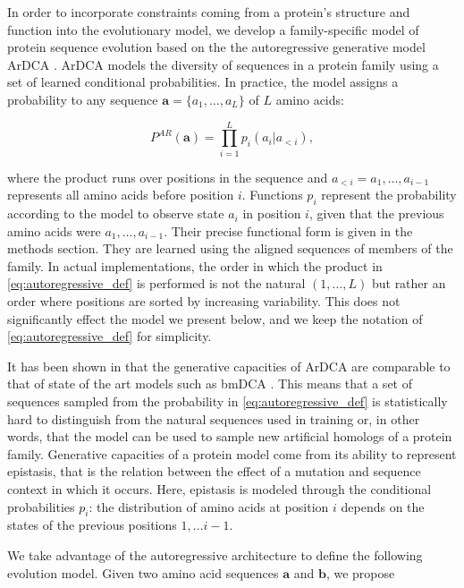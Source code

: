 In order to incorporate constraints coming from a protein's structure and function into the evolutionary model, we develop a family-specific model of protein sequence evolution based on the the autoregressive generative model ArDCA \cite{trinquier_efficientgenerativemodeling_2021}. 
ArDCA models the diversity of sequences in a protein family using a set of learned conditional probabilities. 
In practice, the model assigns a probability to any sequence $\mathbf{a} = \{a_1, \ldots, a_L\}$ of $L$ amino acids: 

\begin{equation}
	\label{eq:autoregressive_def}
	P^{AR}(\mathbf{a}) = \prod_{i=1}^L p_i(a_i \vert a_{<i}),
\end{equation}

where the product runs over positions in the sequence and $a_{<i} = a_1, \ldots, a_{i-1}$ represents all amino acids before position $i$. 
Functions $p_i$ represent the probability according to the model to observe state $a_i$ in position $i$, given that the previous amino acids were $a_1, \ldots, a_{i-1}$. 
Their precise functional form is given in the methods section. 
They are learned using the aligned sequences of members of the family. 
In actual implementations, the order in which the product in \eqref{eq:autoregressive_def} is performed is not the natural $(1, \ldots, L)$ but rather an order where positions are sorted by increasing variability.
This does not significantly effect the model we present below, and we keep the notation of \eqref{eq:autoregressive_def} for simplicity. 

It has been shown in \cite{trinquier_efficientgenerativemodeling_2021} that the generative capacities of ArDCA are comparable to that of state of the art models such as bmDCA \cite{mcgee_generativecapacityprobabilistic_2021}. 
This means that a set of sequences sampled from the probability in \eqref{eq:autoregressive_def} is statistically hard to distinguish from the natural sequences used in training or, in other words, that the model can be used to sample new artificial homologs of a protein family. 
Generative capacities of a protein model come from its ability to represent epistasis, that is the relation between the effect of a mutation and sequence context in which it occurs. 
Here, epistasis is modeled through the conditional probabilities $p_i$: the distribution of amino acids at position $i$ depends on the states of the previous positions $1, \ldots i-1$. 


We take advantage of the autoregressive architecture to define the following evolution model. 
Given two amino acid sequences $\mathbf{a}$ and $\mathbf{b}$, we propose

